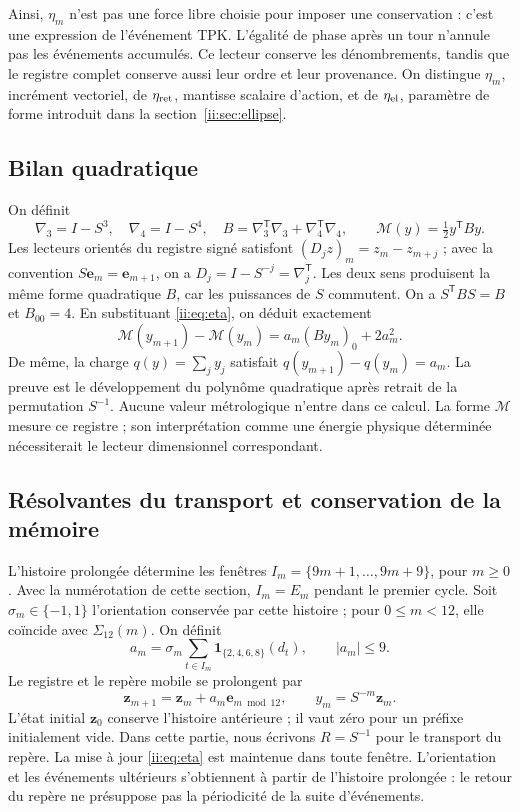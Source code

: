 Ainsi, $\eta_m$ n’est pas une force libre choisie pour imposer une conservation : c’est une expression de l’événement TPK. L’égalité de phase après un tour n’annule pas les événements accumulés. Ce lecteur conserve les dénombrements, tandis que le registre complet conserve aussi leur ordre et leur provenance. On distingue $\eta_m$, incrément vectoriel, de $\eta_{\rm ret}$, mantisse scalaire d’action, et de $\eta_{\rm el}$, paramètre de forme introduit dans la section~\ref{ii:sec:ellipse}.

\subsection{Bilan quadratique}
On définit
\[
\nabla_3=I-S^3,\quad \nabla_4=I-S^4,\quad
B=\nabla_3^{\mathsf T}\nabla_3+\nabla_4^{\mathsf T}\nabla_4,\qquad
\mathcal M(y)=\tfrac12 y^{\mathsf T}By.
\]
Les lecteurs orientés du registre signé satisfont
$(D_jz)_m=z_m-z_{m+j}$ ; avec la convention
$S\mathbf e_m=\mathbf e_{m+1}$, on a
$D_j=I-S^{-j}=\nabla_j^{\mathsf T}$. Les deux sens produisent la même
forme quadratique $B$, car les puissances de $S$ commutent.
On a $S^{\mathsf T}BS=B$ et $B_{00}=4$. En substituant
\eqref{ii:eq:eta}, on déduit exactement
\begin{equation}
\mathcal M(y_{m+1})-\mathcal M(y_m)
=a_m(By_m)_0+2a_m^2.
\label{ii:ii:mem:balance}
\end{equation}
De même, la charge $q(y)=\sum_jy_j$ satisfait
$q(y_{m+1})-q(y_m)=a_m$.
La preuve est le développement du polynôme quadratique après retrait de la
permutation $S^{-1}$. Aucune valeur métrologique n’entre dans ce calcul.
La forme $\mathcal M$ mesure ce registre ; son interprétation comme une
énergie physique déterminée nécessiterait le lecteur dimensionnel correspondant.


\subsection{Résolvantes du transport et conservation de la mémoire}
\label{ii:subsec:ii-memoria-resolvente}

L’histoire prolongée détermine les fenêtres
\(I_m=\{9m+1,\ldots,9m+9\}\), pour \(m\geq0\).
Avec la numérotation de cette section, \(I_m=E_m\) pendant le premier cycle.
Soit \(\sigma_m\in\{-1,1\}\) l’orientation conservée par cette histoire ;
pour \(0\leq m<12\), elle coïncide avec \(\Sigma_{12}(m)\). On définit
\[
 a_m=\sigma_m\sum_{t\in I_m}\mathbf1_{\{2,4,6,8\}}(d_t),
 \qquad |a_m|\leq9.
\]
Le registre et le repère mobile se prolongent par
\[
 \mathbf z_{m+1}=\mathbf z_m+a_m\mathbf e_{m\bmod12},\qquad y_m=S^{-m}\mathbf z_m.
\]
L’état initial \(\mathbf z_0\) conserve l’histoire antérieure ; il vaut zéro pour
un préfixe initialement vide. Dans cette partie, nous écrivons
\(R=S^{-1}\) pour le transport du repère. La mise à jour
\eqref{ii:eq:eta} est maintenue dans toute fenêtre. L’orientation et les événements
ultérieurs s’obtiennent à partir de l’histoire prolongée : le retour du repère
ne présuppose pas la périodicité de la suite d’événements.

